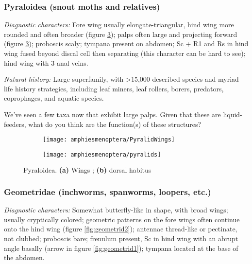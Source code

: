 \subsubsection{Pyraloidea (snout moths and relatives)}
\noindent{}\textit{Diagnostic characters:} Fore wing usually elongate-triangular, hind wing more rounded and often broader (figure \ref{fig:pyraloids}); palps often large and projecting forward (figure \ref{fig:pyraloids}); proboscis scaly; tympana present on abdomen; Sc + R1 and Rs in hind wing fused beyond discal cell then separating (this character can be hard to see); hind wing with 3 anal veins.\vspace{3mm}

\noindent{}\textit{Natural history:} Large superfamily, with \textgreater{}15,000 described species and myriad life history strategies, including leaf miners, leaf rollers, borers, predators, coprophages, and aquatic species.\vspace{3mm}

\begin{theo}
{}We've seen a few taxa now that exhibit large palps. Given that these are liquid-feeders, what do you think are the function(s) of these structures?
\end{theo}

\begin{figure}[ht!]
    \centering
    \begin{subfigure}[ht!]{0.38\textwidth}
        \texttt{[image: amphiesmenoptera/PyralidWings]}
        \caption{}
        \label{fig:pyraloid1}
    \end{subfigure}
    \hfill 
    \begin{subfigure}[ht!]{0.55\textwidth}
        \texttt{[image: amphiesmenoptera/pyralids]}
        \caption{}
        \label{fig:pyraloid2}
    \end{subfigure}
    \caption{Pyraloidea. \textbf{(a)} Wings \citep[][Plate C]{bhl73500}; \textbf{(b)} dorsal habitus \citep[][Fig. 296]{bhlitem92183}}\label{fig:pyraloids}
\end{figure}

\subsubsection{Geometridae (inchworms, spanworms, loopers, etc.)}
\noindent{}\textit{Diagnostic characters:} Somewhat butterfly-like in shape, with broad wings; usually cryptically colored; geometric patterns on the fore wings often continue onto the hind wing (figure \ref{fig:geometrid2}); antennae thread-like or pectinate, not clubbed; proboscis bare; frenulum present, Sc in hind wing with an abrupt angle basally (arrow in figure \ref{fig:geometrid1}); tympana located at the base of the abdomen.\vspace{3mm}

